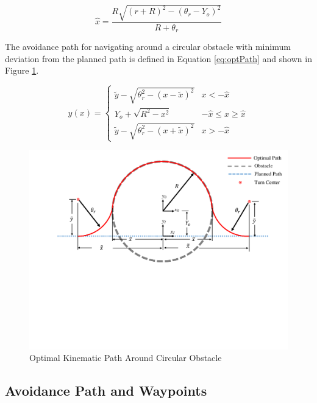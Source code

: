 \documentclass[numbered,pdftex]{ohio-etd}
\begin{document}
\begin{equation}
\label{eq:optPathXhat}
\hat{x} = \frac{R\sqrt{(r+R)^2-(\theta_r-Y_o)^2}}{R+\theta_r}
\end{equation}

\noindent
The avoidance path for navigating around a circular obstacle with minimum deviation from the planned path is defined in Equation \ref{eq:optPath} and shown in Figure \ref{fig:optimalpath}.


\begin{equation}
\label{eq:optPath}
y(x) = \left\{
\begin{array}{ll}
\widetilde{y} -\sqrt{\theta_r^2 - (x-\widetilde{x})^2} &  x < -\hat{x} \\
Y_o +\sqrt{R^2 - x^2} & -\hat{x} \leq x \geq \hat{x}\\
\widetilde{y} -\sqrt{\theta_r^2 - (x+\widetilde{x})^2}&  x > -\hat{x}
\end{array}
\right.
\end{equation}

\begin{figure}[H]
	\centering
	\includegraphics[width=0.7\linewidth ,trim=0 265 0 20,clip,width=15cm]{Figures/optimalPath/optimalPath}
	\caption{Optimal Kinematic Path Around Circular Obstacle}
	\label{fig:optimalpath}
\end{figure}


\subsection{Avoidance Path and Waypoints}
\end{document}
